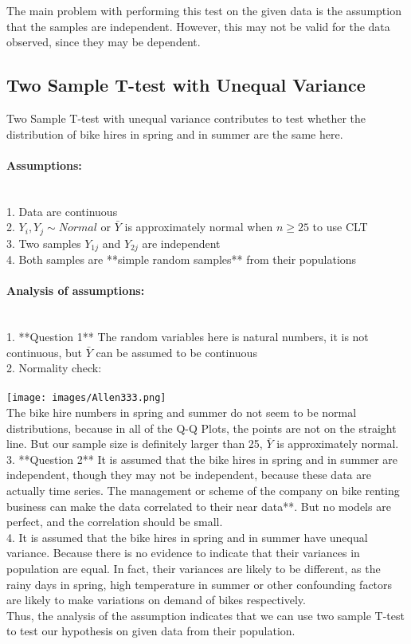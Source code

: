 The main problem with performing this test on the given data is the assumption that the samples are independent. However, this may not be valid for the data observed, since they may be dependent.


\subsection{Two Sample T-test with Unequal Variance}
Two Sample T-test with unequal variance contributes to test whether the distribution of bike hires in spring and in summer are the same here.
\paragraph{Assumptions:} ~\\
1. Data are continuous\\ 
2. $Y_i, Y_j \sim Normal$ or $\bar{Y}$ is approximately normal when $n\ge 25$ to use CLT \\ 
3. Two samples  $Y_{1j}$ and $Y_{2j}$  are independent\\ 
4. Both samples are **simple random samples** from their populations
\paragraph{Analysis of assumptions:} ~\\ 
1. **Question 1** The random variables here is natural numbers, it is not continuous, but $\bar{Y}$ can be assumed to be continuous\\
2. Normality check:\\ \\
\texttt{[image: images/Allen333.png]}\\
The bike hire numbers in spring and summer do not seem to be normal distributions, because in all of the Q-Q Plots, the points are not on the straight line. But our sample size is definitely larger than 25, $\bar{Y}$ is approximately normal.\\
3. **Question 2** It is assumed that the bike hires in spring and in summer are independent, though they may not be independent, because these data are actually time series. The management or scheme of the company on bike renting business can make the data correlated to their near data**. But no models are perfect, and the correlation should be small. \\
4. It is assumed that the bike hires in spring and in summer have unequal variance. Because there is no evidence to indicate that their variances in population are equal. In fact, their variances are likely to be different, as the rainy days in spring, high temperature in summer or other confounding factors are likely to make variations on demand of bikes respectively.\\
Thus, the analysis of the assumption indicates that we can use two sample T-test to test our hypothesis on given data from their population.\\
